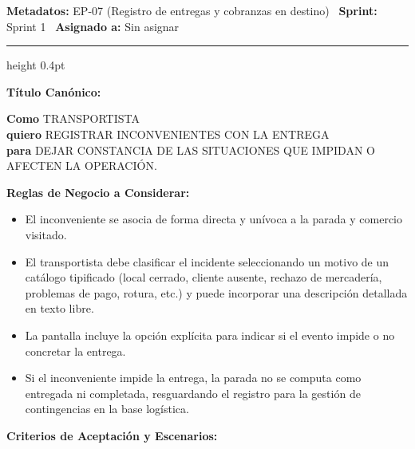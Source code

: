 \documentclass[a4paper,9pt]{article}
\begin{document}
\begin{tcolorbox}[hucard, title={\textbf{HU-56: REGISTRAR INCONVENIENTES CON LA ENTREGA} \hfill \scriptsize \colorbox{bluestatus}{\textbf{\ New\ }} \quad \colorbox{white}{\textcolor{primarydark}{\textbf{\ 1 pt\ }}}}]
\vspace{-1pt}
\noindent\textbf{\footnotesize Metadatos:} EP-07 (Registro de entregas y cobranzas en destino) \textbar\ \textbf{Sprint:} Sprint 1 \textbar\ \textbf{Asignado a:} Sin asignar\par\vspace{2pt}
\hrule height 0.4pt\par\vspace{3pt}
\noindent\textbf{\footnotesize Título Canónico:}\par\vspace{1pt}
{\small \textbf{Como} TRANSPORTISTA \\ \textbf{quiero} REGISTRAR INCONVENIENTES CON LA ENTREGA \\ \textbf{para} DEJAR CONSTANCIA DE LAS SITUACIONES QUE IMPIDAN O AFECTEN LA OPERACIÓN.}\par\vspace{3pt}
\noindent\textbf{\footnotesize Reglas de Negocio a Considerar:}\par\vspace{1pt}
{\footnotesize
\begin{itemize}[leftmargin=12pt, nosep, itemsep=1.5pt, topsep=1pt]
\item El inconveniente se asocia de forma directa y unívoca a la parada y comercio visitado.
\item El transportista debe clasificar el incidente seleccionando un motivo de un catálogo tipificado (local cerrado, cliente ausente, rechazo de mercadería, problemas de pago, rotura, etc.) y puede incorporar una descripción detallada en texto libre.
\item La pantalla incluye la opción explícita para indicar si el evento impide o no concretar la entrega.
\item Si el inconveniente impide la entrega, la parada no se computa como entregada ni completada, resguardando el registro para la gestión de contingencias en la base logística.
\end{itemize}
}\par\vspace{3pt}
\noindent\textbf{\footnotesize Criterios de Aceptación y Escenarios:}\par\vspace{2pt}
{\footnotesize
}
\end{tcolorbox}
\end{document}
